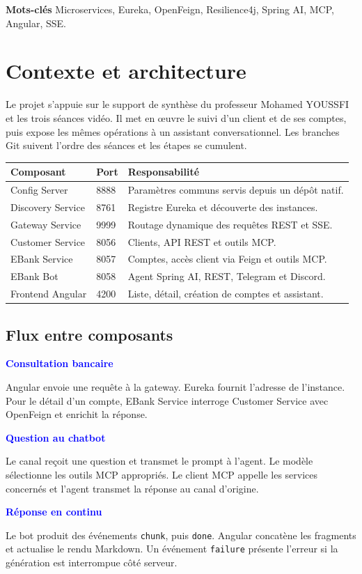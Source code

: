 \documentclass[11pt,a4paper]{article}
\newcommand{\code}[1]{\texttt{#1}}
\newcommand{\step}[2]{\textcolor{Blue}{\textbf{#1}}\par #2\par}
\begin{document}
\textbf{Mots-clés} \enspace Microservices, Eureka, OpenFeign, Resilience4j, Spring AI, MCP, Angular, SSE.

\tableofcontents

\clearpage
\section{Contexte et architecture}
Le projet s'appuie sur le support de synthèse du professeur Mohamed YOUSSFI et les trois séances vidéo. Il met en œuvre le suivi d'un client et de ses comptes, puis expose les mêmes opérations à un assistant conversationnel. Les branches Git suivent l'ordre des séances et les étapes se cumulent.

\begin{center}
\begin{tabularx}{\linewidth}{@{}llY@{}}
\toprule
\textbf{Composant} & \textbf{Port} & \textbf{Responsabilité}\\
\midrule
Config Server & 8888 & Paramètres communs servis depuis un dépôt natif.\\
Discovery Service & 8761 & Registre Eureka et découverte des instances.\\
Gateway Service & 9999 & Routage dynamique des requêtes REST et SSE.\\
Customer Service & 8056 & Clients, API REST et outils MCP.\\
EBank Service & 8057 & Comptes, accès client via Feign et outils MCP.\\
EBank Bot & 8058 & Agent Spring AI, REST, Telegram et Discord.\\
Frontend Angular & 4200 & Liste, détail, création de comptes et assistant.\\
\bottomrule
\end{tabularx}
\end{center}

\subsection{Flux entre composants}
\step{Consultation bancaire}{Angular envoie une requête à la gateway. Eureka fournit l'adresse de l'instance. Pour le détail d'un compte, EBank Service interroge Customer Service avec OpenFeign et enrichit la réponse.}
\step{Question au chatbot}{Le canal reçoit une question et transmet le prompt à l'agent. Le modèle sélectionne les outils MCP appropriés. Le client MCP appelle les services concernés et l'agent transmet la réponse au canal d'origine.}
\step{Réponse en continu}{Le bot produit des événements \code{chunk}, puis \code{done}. Angular concatène les fragments et actualise le rendu Markdown. Un événement \code{failure} présente l'erreur si la génération est interrompue côté serveur.}
\end{document}
